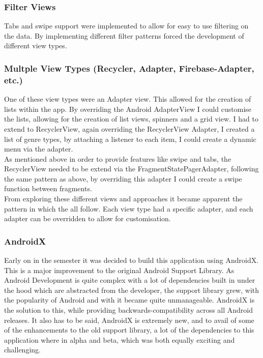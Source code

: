 \subsubsection{ Filter Views }
Tabs and swipe support were implemented to allow for easy to use filtering on the data. By implementing different filter patterns forced the development of different view types.

\subsubsection{ Multple View Types (Recycler, Adapter, Firebase-Adapter, etc.) }
One of these view types were an Adapter view. This allowed for the creation of lists within the app. By overriding the Android AdapterView I could customise the lists, allowing for the creation of list views, spinners and a grid view.
I had to extend to RecyclerView, again overriding the RecyclerView Adapter, I created a list of genre types, by attaching a listener to each item, I could create a dynamic menu via the adapter. 
\\As mentioned above in order to provide features like swipe and tabs, the RecyclerView needed to be extend via the FragmentStatePagerAdapter, following the same pattern as above, by overriding this adapter I could create a swipe function between fragments. 
\\From exploring these different views and approaches it became apparent the pattern in which the all follow. Each view type had a specific adapter, and each adapter can be overridden to allow for customisation.

\subsubsection{ AndroidX }
Early on in the semester it was decided to build this application using AndroidX. This is a major improvement to the original Android Support Library. As Android Development is quite complex with a lot of dependencies built in under the hood which are abstracted from the developer, the support library grew, with the popularity of Android and with it became quite unmanageable. AndroidX is the solution to this, while providing backwards-compatibility across all Android releases. It also has to be said, AndroidX is extremely new, and to avail of some of the enhancements to the old support library, a lot of the dependencies to this application where in alpha and beta, which was both equally exciting and challenging.

